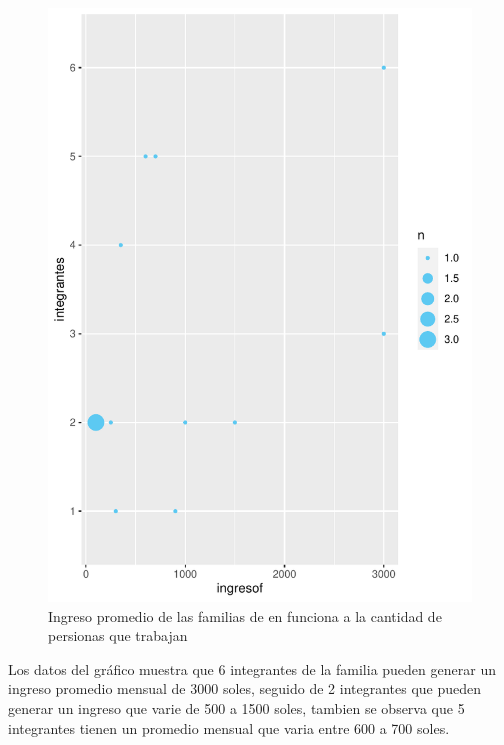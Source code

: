 \documentclass[12pt]{article}\usepackage[]{graphicx}\usepackage[]{xcolor}
\makeatletter
\def\maxwidth{ %
  \ifdim\Gin@nat@width>\linewidth
    \linewidth
  \else
    \Gin@nat@width
  \fi
}
\newenvironment{kframe}{%
 \def\at@end@of@kframe{}%
 \ifinner\ifhmode%
  \def\at@end@of@kframe{\end{minipage}}%
  \begin{minipage}{\columnwidth}%
 \fi\fi%
 \def\FrameCommand##1{\hskip\@totalleftmargin \hskip-\fboxsep
 \colorbox{shadecolor}{##1}\hskip-\fboxsep
     \hskip-\linewidth \hskip-\@totalleftmargin \hskip\columnwidth}%
 \MakeFramed {\advance\hsize-\width
   \@totalleftmargin\z@ \linewidth\hsize
   \@setminipage}}%
 {\par\unskip\endMakeFramed%
 \at@end@of@kframe}
\newenvironment{knitrout}{}{} %
\makeatother
\begin{document}
	\begin{figure}[H]
	\centering
\begin{knitrout}
\color{fgcolor}\begin{kframe}


{\ttfamily\noindent\color{warningcolor}{\#\# Warning: NAs introducidos por coerción}}\end{kframe}
\includegraphics[width=\maxwidth]{figure/nose-1} 
\end{knitrout}
	\caption{Ingreso promedio de las familias de \comunidad en funciona a la cantidad de persionas que trabajan}
	\end{figure}
Los datos del gráfico muestra que 6 integrantes de la familia pueden generar un ingreso promedio mensual de 3000 soles, seguido de 2 integrantes que pueden generar un ingreso que varie de 500 a 1500 soles, tambien se observa que 5 integrantes tienen un promedio mensual que varia entre 600 a 700 soles.
\end{document}
